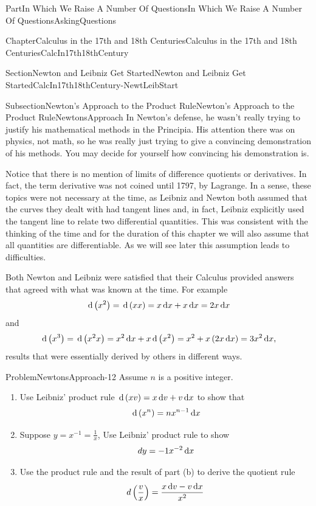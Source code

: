 \documentclass[oneside,10pt,]{book}
\numberwithin{equation}{part}
\newcommand{\dx}[1]{\,{\rm d}#1}
\begin{document}
\begin{partptx}{Part}{In Which We Raise A Number Of Questions}{}{In Which We Raise A Number Of Questions}{}{}{AskingQuestions}
\begin{chapterptx}{Chapter}{Calculus in the 17th and 18th Centuries}{}{Calculus in the 17th and 18th Centuries}{}{}{CalcIn17th18thCentury}
\begin{sectionptx}{Section}{Newton and Leibniz Get Started}{}{Newton and Leibniz Get Started}{}{}{CalcIn17th18thCentury-NewtLeibStart}
\begin{subsectionptx}{Subsection}{Newton's Approach to the Product Rule}{}{Newton's Approach to the Product Rule}{}{}{NewtonsApproach}
In Newton's defense, he wasn't really trying to justify his mathematical methods in the Principia.  His attention there was on physics, not math, so he was really just trying to give a convincing demonstration of his methods.  You may decide for yourself how convincing his demonstration is.%
\par
{} Notice that there is no mention of limits of difference quotients or derivatives.  In fact, the term derivative was not coined until 1797, by Lagrange.  In a sense, these topics were not necessary at the time, as Leibniz and Newton both assumed that the curves they dealt with had tangent lines and, in fact, Leibniz explicitly used the tangent line to relate two differential quantities.  This was consistent with the thinking of the time and for the duration of this chapter we will also assume that all quantities are differentiable.  As we will see later this assumption leads to difficulties.%
\par
Both Newton and Leibniz were satisfied that their Calculus provided answers that agreed with what was known at the time.  For example%
\begin{equation*}
\dx{ \left(x^2\right)}=\dx{\left(xx\right)}=x\dx{ x}+x\dx{
x}=2x\dx{ x} 
\end{equation*}
and%
\begin{equation*}
\dx{\left(x^3\right)}=\dx{\left(x^2x\right)}=x^2\dx{
x}+x\dx{\left(x^2\right)}=x^2+x\left(2x\dx{
x}\right)=3x^2\dx{ x}\text{,}
\end{equation*}
results that were essentially derived by others in different ways.%
\begin{problem}{Problem}{}{NewtonsApproach-12}%
Assume \(n\) is a positive integer.%
\begin{enumerate}[font=\bfseries,label=(\alph*),ref=\alph*]%
\item{}Use Leibniz' product rule \(\dx{\left(xv\right)}=x\dx{v}+v\dx{x}\) to show that%
\begin{equation*}
\dx{\left(x^n\right)}=nx^{n-1}\dx{x}
\end{equation*}
%
\item{}Suppose \(y=x^{-1}=\frac{1}{x}\), Use Leibniz' product rule to show%
\begin{equation*}
dy=-1x^{-2}\dx{x}
\end{equation*}
%
\item{}Use the product rule and the result of part (b) to derive the quotient rule%
\begin{equation*}
d\left(\frac{v}{x}\right)=\frac{x\dx{v}-v\dx{x}}{x^2}

\end{equation*}
\end{enumerate}
\end{problem}
\end{subsectionptx}
\end{sectionptx}
\end{chapterptx}
\end{partptx}
\end{document}
